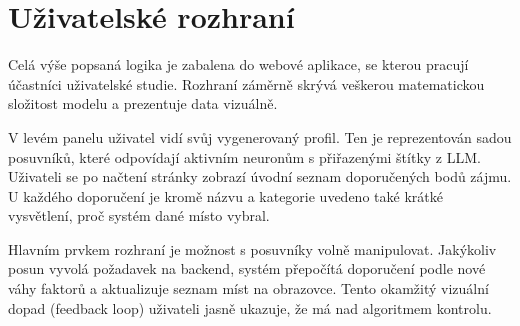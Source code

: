 \section{Uživatelské rozhraní}
\label{sec:ui}

Celá výše popsaná logika je zabalena do webové aplikace, se kterou pracují účastníci uživatelské studie. Rozhraní záměrně skrývá veškerou matematickou složitost modelu a prezentuje data vizuálně.

V levém panelu uživatel vidí svůj vygenerovaný profil. Ten je reprezentován sadou posuvníků, které odpovídají aktivním neuronům s přiřazenými štítky z LLM. Uživateli se po načtení stránky zobrazí úvodní seznam doporučených bodů zájmu. U každého doporučení je kromě názvu a kategorie uvedeno také krátké vysvětlení, proč systém dané místo vybral.

Hlavním prvkem rozhraní je možnost s posuvníky volně manipulovat. Jakýkoliv posun vyvolá požadavek na backend, systém přepočítá doporučení podle nové váhy faktorů a aktualizuje seznam míst na obrazovce. Tento okamžitý vizuální dopad (feedback loop) uživateli jasně ukazuje, že má nad algoritmem kontrolu.